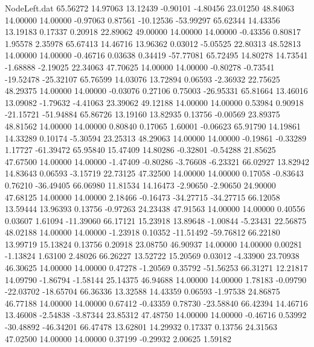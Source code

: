 \begin{filecontents}{NodeLeft.dat}
  65.56272   14.97063   13.12439    -0.90101   -4.80456   23.01250   48.84063   14.00000   14.00000   -0.97063    0.87561  -10.12536  -53.99297
  65.62344   14.43356   13.19183     0.17337    0.20918   22.89062   49.00000   14.00000   14.00000   -0.43356    0.80817    1.95578    2.35978
  65.67413   14.46716   13.96362     0.03012   -5.05525   22.80313   48.52813   14.00000   14.00000   -0.46716    0.03638    0.34419  -57.77081
  65.72495   14.80278   14.73541    -1.68888   -2.19025   22.34063   47.70625   14.00000   14.00000   -0.80278   -0.73541  -19.52478  -25.32107
  65.76599   14.03076   13.72894     0.06593   -2.36932   22.75625   48.29375   14.00000   14.00000   -0.03076    0.27106    0.75003  -26.95331
  65.81664   13.46016   13.09082    -1.79632   -4.41063   23.39062   49.12188   14.00000   14.00000    0.53984    0.90918  -21.15721  -51.94884
  65.86726   13.19160   13.82935     0.13756   -0.00569   23.89375   48.81562   14.00000   14.00000    0.80840    0.17065    1.60001   -0.06623
  65.91790   14.19861   14.33289     0.10174   -5.30594   23.25313   48.29063   14.00000   14.00000   -0.19861   -0.33289    1.17727  -61.39472
  65.95840   15.47409   14.80286    -0.32801   -0.54288   21.85625   47.67500   14.00000   14.00000   -1.47409   -0.80286   -3.76608   -6.23321
  66.02927   13.82942   14.83643     0.06593   -3.15719   22.73125   47.32500   14.00000   14.00000    0.17058   -0.83643    0.76210  -36.49405
  66.06980   11.81534   14.16473    -2.90650   -2.90650   24.90000   47.68125   14.00000   14.00000    2.18466   -0.16473  -34.27715  -34.27715
  66.12058   13.59444   13.96393     0.13756   -0.97263   24.23438   47.91563   14.00000   14.00000    0.40556    0.03607    1.61094  -11.39060
  66.17121   15.23918   13.89648    -1.00844   -5.23431   22.56875   48.02188   14.00000   14.00000   -1.23918    0.10352  -11.51492  -59.76812
  66.22180   13.99719   15.13824     0.13756    0.20918   23.08750   46.90937   14.00000   14.00000    0.00281   -1.13824    1.63100    2.48026
  66.26227   13.52722   15.20569     0.03012   -4.33900   23.70938   46.30625   14.00000   14.00000    0.47278   -1.20569    0.35792  -51.56253
  66.31271   12.21817   14.09790    -1.86794   -1.58144   25.14375   46.94688   14.00000   14.00000    1.78183   -0.09790  -22.03702  -18.65704
  66.36336   13.32588   14.43359     0.06593   -1.97538   24.86875   46.77188   14.00000   14.00000    0.67412   -0.43359    0.78730  -23.58840
  66.42394   14.46716   13.46008    -2.54838   -3.87344   23.85312   47.48750   14.00000   14.00000   -0.46716    0.53992  -30.48892  -46.34201
  66.47478   13.62801   14.29932     0.17337    0.13756   24.31563   47.02500   14.00000   14.00000    0.37199   -0.29932    2.00625    1.59182

\end{filecontents}
